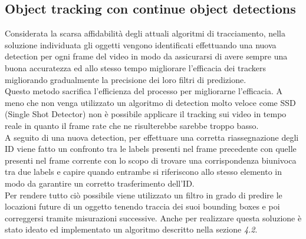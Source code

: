 \subsection{Object tracking con continue object detections}
Considerata la scarsa affidabilità degli attuali algoritmi di tracciamento, nella soluzione individuata gli oggetti vengono identificati effettuando una nuova detection per ogni frame del video in modo da assicurarsi di avere sempre una buona accuratezza ed allo stesso tempo migliorare l'efficacia dei trackers migliorando gradualmente la precisione dei loro filtri di predizione.\\
Questo metodo sacrifica l'efficienza del processo per migliorarne l'efficacia. A meno che non venga utilizzato un algoritmo di detection molto veloce come SSD (Single Shot Detector)\cite{ssd} non è possibile applicare il tracking sui video in tempo reale in quanto il frame rate che ne risulterebbe sarebbe troppo basso.\\
A seguito di una nuova detection, per effettuare una corretta riassegnazione degli ID viene fatto un confronto tra le labels presenti nel frame precedente con quelle presenti nel frame corrente con lo scopo di trovare una corrispondenza biunivoca tra due labels e capire quando entrambe si riferiscono allo stesso elemento in modo da garantire un corretto trasferimento dell'ID.\\
Per rendere tutto ciò possibile viene utilizzato un filtro in grado di predire le locazioni future di un oggetto tenendo traccia dei suoi bounding boxes e poi correggersi tramite misurazioni successive. Anche per realizzare questa soluzione è stato ideato ed implementato un algoritmo descritto nella sezione \textit{4.2}.
